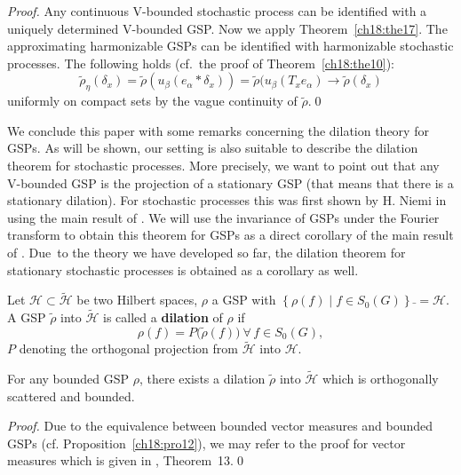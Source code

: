 \documentclass[graybox]{svmult}
\begin{document}
\begin{proof}
Any continuous V-bounded stochastic process can be
identified with a uniquely determined V-bounded GSP. Now we apply
Theorem~\ref{ch18:the17}. The approximating harmonizable GSPs can be identified with
harmonizable stochastic processes.
The following holds (cf.\ the proof of Theorem~\ref{ch18:the10}):
\[
\tilde{\rho}_{\eta }(\delta_{x}) =
\tilde{\rho}(u_{\beta}(e_{\alpha}\ast {}\delta_{x})) =
 \tilde{\rho}(u_{\beta}(T_{x}e_{\alpha})
 \rightarrow \tilde{\rho}(\delta _{x})
\]
uniformly on compact sets by the vague continuity
of $\tilde{\rho}$.\qed
\end{proof}

We conclude this paper with some remarks concerning the
dilation theory for GSPs.  As will be shown, our setting is also suitable
to describe the dilation theorem for stochastic processes.  More
precisely, we want to point out that any V-bounded GSP is the projection
of a stationary GSP (that means that there is a stationary dilation).
For stochastic processes this was first shown by H.  Niemi in
\cite{ni75-4} using the main result of \cite{ni77}.
We will use the invariance of GSPs under the Fourier transform
to obtain this theorem for GSPs as a direct corollary of the main result
of \cite{ni77}. Due~to the theory we have developed so far, the
dilation theorem for stationary stochastic processes is obtained as a
corollary as well.

\begin{definition}\label{ch18:def11}
Let $\mathcal{H} \subset \tilde{\mathcal{H}}$ be two
Hilbert spaces, $\rho $ a GSP with
$\left\{ \rho (f) \mid f {\in} {S_{0}(G)}
\right\}\bar{\;} = \mathcal{H}$.
A GSP $\tilde{\rho}$ into
$\tilde{\mathcal{H}}$ is called a \textbf{dilation} of
 $\rho $ if
\[
\rho (f) = P\bigl( \tilde{\rho}(f)\bigr) \
\forall \, f \in {S_{0}(G)} ,
\]
$P$ denoting the orthogonal projection from $\tilde{\mathcal{H}}$
into $\mathcal{H}$.
\end{definition}

\setcounter{theorem}{18}
\begin{theorem}\label{ch18:the19}
For any bounded GSP $\rho $, there exists a dilation $\tilde{\rho}$ into
$\tilde{\mathcal{H}}$ which is orthogonally scattered and bounded.
\end{theorem}

\begin{proof}
Due to the equivalence between bounded vector
measures and bounded GSPs (cf. Proposition~\ref{ch18:pro12}), we may refer to the proof
for vector measures which is given in \cite{ni77}, Theorem~13.\qed
\end{proof}
\end{document}
